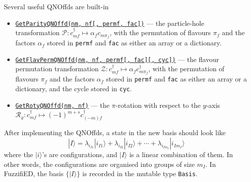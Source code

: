 \documentclass{timesjhep}
\begin{document}
Several useful QNOffds are built-in
\begin{itemize}
    \item \href{https://docs.fuzzified.world/models/\#FuzzifiED.GetParityQNOffd}{\lstinline|GetParityQNOffd(nm, nf[, permf, fac])|} --- the particle-hole transformation $\mathcal{P}:c^\dagger_{mf}\mapsto\alpha_fc_{m\pi_f}$, with the permutation of flavours $\pi_f$ and the factors $\alpha_f$ stored in \lstinline|permf| and \lstinline|fac| as either an array or a dictionary. 
    \item \href{https://docs.fuzzified.world/models/\#FuzzifiED.GetFlavPermQNOffd}{\lstinline|GetFlavPermQNOffd(nm, nf, permf[, fac][, cyc])|} --- the flavour permutation transformation $\mathcal{Z}:c^\dagger_{mf}\mapsto\alpha_fc_{m\pi_f}^\dagger$, with the permutation of flavours $\pi_f$ and the factors $\alpha_f$ stored in \lstinline|permf| and \lstinline|fac| as either an array or a dictionary, and the cycle stored in \lstinline|cyc|. 
    \item \href{https://docs.fuzzified.world/models/\#FuzzifiED.GetRotyQNOffd-Tuple{Int64,\%20Int64}}{\lstinline|GetRotyQNOffd(nm, nf)|} --- the $\pi$-rotation with respect to the $y$-axis $\mathcal{R}_y:c^\dagger_{mf}\mapsto(-1)^{m+s}c_{(-m)f}^\dagger$
\end{itemize}

After implementing the QNOffds, a state in the new basis should look like 
\begin{equation}
    |I\rangle=\lambda_{i_{I1}}|i_{I1}\rangle+\lambda_{i_{I2}}|i_{I2}\rangle+\cdots+\lambda_{i_{Im_I}}|i_{Im_I}\rangle
\end{equation}
where the $|i\rangle$'s are configurations, and $|I\rangle$ is a linear combination of them. In other words, the configurations are organised into groups of size $m_I$. In FuzzifiED, the basis $\{|I\rangle\}$ is recorded in the mutable type \lstinline|Basis|. 
\end{document}
